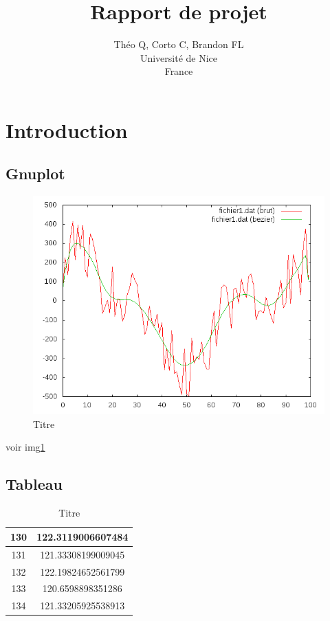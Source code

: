 \documentclass{article}
\title{Rapport de projet}
\author{Théo Q, Corto C, Brandon FL \\
Université de Nice\\
France}
\begin{document}
\maketitle


\section{Introduction}



\subsection{Gnuplot}
\begin{figure}[h]
\centering
\includegraphics[width=\linewidth]{courbe-fichier1-bezier.png} 
\caption{Titre}
\label{fig:toto}
\end{figure}
voir img\ref{fig:toto}

\subsection{Tableau}
\begin{table}[h]
\centering
\begin{tabular}{|c|c|}
\hline 
130 & 122.3119006607484 \\ 
\hline 
131 & 121.33308199009045 \\ 
\hline 
132 & 122.19824652561799 \\ 
\hline 
133 & 120.6598898351286 \\ 
\hline 
134 & 121.33205925538913 \\ 
\hline 
\end{tabular} 
\caption{Titre}
\label{tab:toto2}
\end{table}
\end{document}
